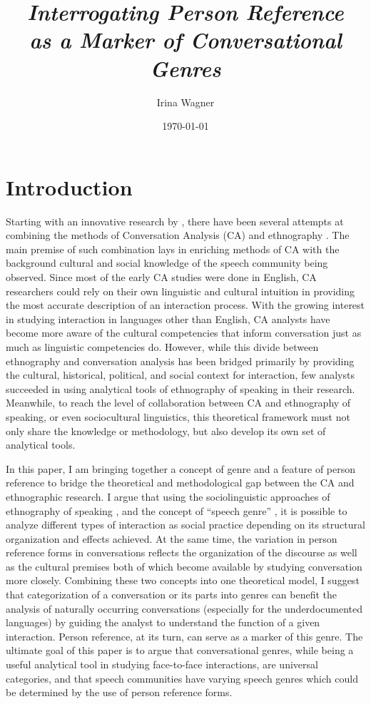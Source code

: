 \documentclass[12pt, draft]{article}
\title{\textit{Interrogating Person Reference \\ as a Marker of Conversational Genres}}
\author{\vspace{50pt} Irina Wagner}
\date{\today}
\begin{document}
\begin{titlingpage}
\setlength{\droptitle}{100pt}
\maketitle
\end{titlingpage}
\doublespacing
\indent

\section{Introduction}
Starting with an innovative research by \textcite{moerman1988}, there have been several attempts at combining the methods of Conversation Analysis (CA) and ethnography \parencite{sidnell2008, dingemanse2014}. The main premise of such combination lays in enriching methods of CA with the background cultural and social knowledge of the speech community being observed. Since most of the early CA studies were done in English, CA researchers could rely on their own linguistic and cultural intuition in providing the most accurate description of an interaction process. With the growing interest in studying interaction in languages other than English, CA analysts have become more aware of the cultural competencies that inform conversation just as much as linguistic competencies do. However, while this divide between ethnography and conversation analysis has been bridged primarily by providing the cultural, historical, political, and social context for interaction, few analysts succeeded in using analytical tools of ethnography of speaking in their research. Meanwhile, to reach the level of collaboration between CA and ethnography of speaking, or even sociocultural linguistics, this theoretical framework must not only share the knowledge or methodology, but also develop its own set of analytical tools.

In this paper, I am bringing together a concept of genre and a  feature of person reference to bridge the theoretical and methodological gap between the CA and ethnographic research. I argue that using the sociolinguistic approaches of ethnography of speaking \parencite{hymes1974}, and the concept of ``speech genre'' \parencite{bakhtin1986}, it is possible to analyze different types of interaction as social practice depending on its structural organization and effects achieved. At the same time, the variation in person reference forms in conversations reflects the organization of the discourse as well as the cultural premises both of which become available by studying conversation more closely. Combining these two concepts into one theoretical model, I suggest that categorization of a conversation or its parts into genres can benefit the analysis of naturally occurring conversations (especially for the underdocumented languages) by guiding the analyst to understand the function of a given interaction. Person reference, at its turn, can serve as a marker of this genre. The ultimate goal of this paper is to argue that conversational genres, while being a useful analytical tool in studying face-to-face interactions, are universal categories, and that speech communities have varying speech genres which could be determined by the use of person reference forms.
\end{document}
